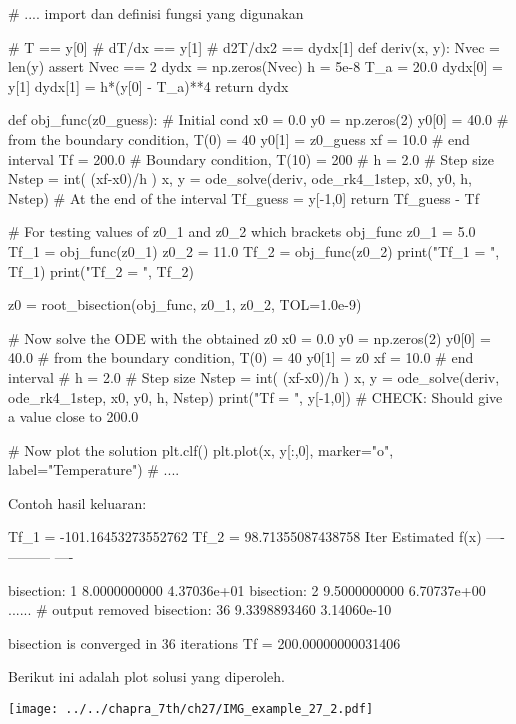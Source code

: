 \begin{pythoncode}
# .... import dan definisi fungsi yang digunakan

# T == y[0]
# dT/dx == y[1]
# d2T/dx2 == dydx[1]
def deriv(x, y):
    Nvec = len(y)
    assert Nvec == 2
    dydx = np.zeros(Nvec)
    h = 5e-8
    T_a = 20.0
    dydx[0] = y[1]
    dydx[1] = h*(y[0] - T_a)**4
    return dydx

def obj_func(z0_guess):
    # Initial cond
    x0 = 0.0
    y0 = np.zeros(2)
    y0[0] = 40.0 # from the boundary condition, T(0) = 40
    y0[1] = z0_guess
    xf = 10.0  # end interval
    Tf = 200.0 # Boundary condition, T(10) = 200
    #
    h = 2.0 # Step size
    Nstep = int( (xf-x0)/h )
    x, y = ode_solve(deriv, ode_rk4_1step, x0, y0, h, Nstep)
    # At the end of the interval
    Tf_guess = y[-1,0]
    return Tf_guess - Tf


# For testing values of z0_1 and z0_2 which brackets obj_func
z0_1 = 5.0
Tf_1 = obj_func(z0_1)
z0_2 = 11.0
Tf_2 = obj_func(z0_2)
print("Tf_1 = ", Tf_1)
print("Tf_2 = ", Tf_2)

z0 = root_bisection(obj_func, z0_1, z0_2, TOL=1.0e-9)

# Now solve the ODE with the obtained z0
x0 = 0.0
y0 = np.zeros(2)
y0[0] = 40.0 # from the boundary condition, T(0) = 40
y0[1] = z0
xf = 10.0  # end interval
#
h = 2.0 # Step size
Nstep = int( (xf-x0)/h )
x, y = ode_solve(deriv, ode_rk4_1step, x0, y0, h, Nstep)
print("Tf = ", y[-1,0])  # CHECK: Should give a value close to 200.0

# Now plot the solution
plt.clf()
plt.plot(x, y[:,0], marker="o", label="Temperature")
# ....
\end{pythoncode}


Contoh hasil keluaran:
\begin{textcode}
Tf_1 =  -101.16453273552762
Tf_2 =  98.71355087438758
             Iter      Estimated          f(x)
             ----      ---------          ----

bisection:     1       8.0000000000     4.37036e+01
bisection:     2       9.5000000000     6.70737e+00
......  # output removed
bisection:    36       9.3398893460     3.14060e-10

bisection is converged in 36 iterations
Tf =  200.00000000031406
\end{textcode}


Berikut ini adalah plot solusi yang diperoleh.

{\centering
\texttt{[image: ../../chapra\_7th/ch27/IMG\_example\_27\_2.pdf]}
\par}


